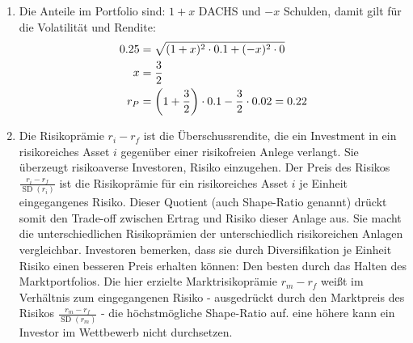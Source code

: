 \documentclass{article}
\DeclareMathOperator{\SD}{SD}
\begin{document}
\begin{enumerate}[label=(\alph*)]
		\item Die Anteile im Portfolio sind: $1+x$ DACHS und $-x$ Schulden, damit gilt für die Volatilität und Rendite:
		\begin{align}
			0.25 &= \sqrt{(1+x)^2\cdot 0.1 + (-x)^2\cdot 0} \notag \\
			x &= \frac{3}{2} \notag \\
			r_P &= \left(1+\frac{3}{2}\right)\cdot 0.1 - \frac{3}{2}\cdot 0.02 = 0.22 \notag
		\end{align}
		\item Die Risikoprämie $r_i-r_f$ ist die Überschussrendite, die ein Investment in ein risikoreiches Asset $i$ gegenüber einer risikofreien Anlege verlangt. Sie überzeugt risikoaverse Investoren, Risiko einzugehen. Der Preis des Risikos $\frac{r_i-r_f}{\SD(r_i)}$ ist die Risikoprämie für ein risikoreiches Asset $i$ je Einheit eingegangenes Risiko. Dieser Quotient (auch Shape-Ratio genannt) drückt somit den Trade-off zwischen Ertrag und Risiko dieser Anlage aus. Sie macht die unterschiedlichen Risikoprämien der unterschiedlich risikoreichen Anlagen vergleichbar. Investoren bemerken, dass sie durch Diversifikation je Einheit Risiko einen besseren Preis erhalten können: Den besten durch das Halten des Marktportfolios. Die hier erzielte Marktrisikoprämie $r_m-r_f$ weißt im Verhältnis zum eingegangenen Risiko - ausgedrückt durch den Marktpreis des Risikos $\frac{r_m-r_f}{\SD(r_m)}$ - die höchstmögliche Shape-Ratio auf. eine höhere kann ein Investor im Wettbewerb nicht durchsetzen.
	\end{enumerate}
\end{document}
